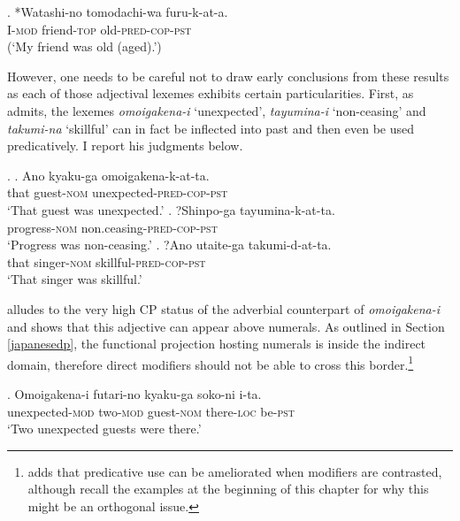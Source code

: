 \exg. *Watashi-no tomodachi-wa furu-k-at-a.\\
I-\textsc{mod} friend-\textsc{top} old-\textsc{pred-cop-pst}\\
(`My friend was old (aged).’)

However, one needs to be careful not to draw early conclusions from these results as each of those adjectival lexemes exhibits certain particularities. First, as \citet{ayano:2010:revisiting} admits, the lexemes \textit{omoigakena-i} `unexpected', \textit{tayumina-i} `non-ceasing’ and \textit{takumi-na} `skillful' can in fact be inflected into past and then even be used predicatively. I report his judgments below.

\ex. \ag. Ano kyaku-ga omoigakena-k-at-ta.\\
that guest-\textsc{nom} unexpected-\textsc{pred-cop-pst}\\
`That guest was unexpected.'
\bg. ?Shinpo-ga tayumina-k-at-ta.\\
progress-\textsc{nom} non.ceasing-\textsc{pred-cop-pst}\\
`Progress was non-ceasing.'
\cg. ?Ano utaite-ga takumi-d-at-ta.\\
that singer-\textsc{nom} skillful-\textsc{pred-cop-pst}\\
`That singer was skillful.' \null \hfill \citep[109]{ayano:2010:revisiting}

\citet{watanabe:2017:attributive} alludes to the very high CP status of the adverbial counterpart of \textit{omoigakena-i} and shows that this adjective can appear above numerals. As outlined in Section \ref{japanesedp}, the functional projection hosting numerals is inside the indirect domain, therefore direct modifiers should not be able to cross this border.\footnote{\citet{hoshi:2002:kaynean} adds that predicative use can be ameliorated when modifiers are contrasted, although recall the examples at the beginning of this chapter for why this might be an orthogonal issue.}

\exg. Omoigakena-i futari-no kyaku-ga soko-ni i-ta.\\
unexpected-\textsc{mod} two-\textsc{mod} guest-\textsc{nom} there-\textsc{loc} be-\textsc{pst}\\
`Two unexpected guests were there.’ \null \hfill \citep[790]{watanabe:2017:attributive}

